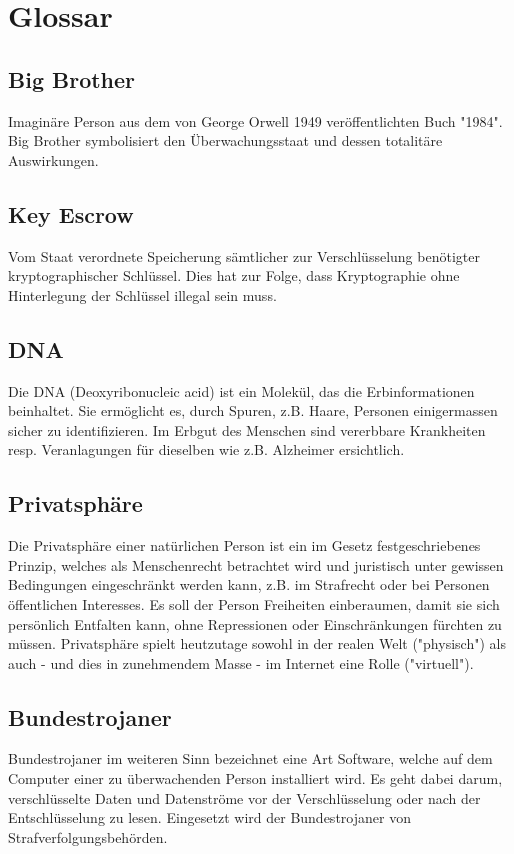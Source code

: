 \section{
Glossar
}

\subsection{
Big Brother 
}
Imagin\"are Person aus dem von George Orwell 1949 ver\"offentlichten 
Buch "1984". Big Brother symbolisiert den \"Uberwachungsstaat und dessen 
totalit\"are Auswirkungen. 

\subsection{
Key Escrow 
}
Vom Staat verordnete Speicherung s\"amtlicher zur Verschl\"usselung 
ben\"otigter kryptographischer Schl\"ussel. Dies hat zur Folge, dass 
Kryptographie ohne Hinterlegung der Schl\"ussel illegal sein muss. 

\subsection{
DNA 
}
Die DNA (Deoxyribonucleic acid) ist ein Molek\"ul, das die 
Erbinformationen beinhaltet. Sie erm\"oglicht es, durch Spuren, z.B. 
Haare, Personen einigermassen sicher zu identifizieren. Im Erbgut des 
Menschen sind vererbbare Krankheiten resp. Veranlagungen f\"ur dieselben 
wie z.B. Alzheimer ersichtlich. 

\subsection{
Privatsph\"are 
}
Die Privatsph\"are einer nat\"urlichen Person ist ein im Gesetz 
festgeschriebenes Prinzip, welches als Menschenrecht betrachtet wird und 
juristisch unter gewissen Bedingungen eingeschr\"ankt werden kann, z.B. 
im Strafrecht oder bei Personen \"offentlichen Interesses. Es soll der 
Person Freiheiten einberaumen, damit sie sich pers\"onlich Entfalten 
kann, ohne Repressionen oder Einschr\"ankungen f\"urchten zu m\"ussen. 
Privatsph\"are spielt heutzutage sowohl in der realen Welt ("physisch") 
als auch - und dies in zunehmendem Masse - im Internet eine Rolle 
("virtuell"). 

\subsection{
Bundestrojaner 
}
Bundestrojaner im weiteren Sinn bezeichnet eine Art Software, welche auf 
dem Computer einer zu \"uberwachenden Person installiert wird. Es geht 
dabei darum, verschl\"usselte Daten und Datenstr\"ome vor der 
Verschl\"usselung oder nach der Entschl\"usselung zu lesen. Eingesetzt 
wird der Bundestrojaner von Strafverfolgungsbeh\"orden. 

